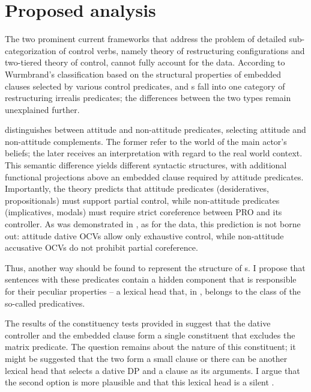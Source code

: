\documentclass[output=paper,colorlinks,citecolor=brown,newtxmath]{langsci/langscibook}
\begin{document}
\section{Proposed analysis}\label{s3}

The two prominent current frameworks that address the problem of detailed sub-categorization of control verbs, namely  theory of restructuring configurations and  two-tiered theory of control, cannot fully account for the  data. According to Wurmbrand’s classification based on the structural properties of embedded clauses selected by various control predicates,   and s fall into one category of restructuring irrealis predicates; the differences between the two types remain unexplained further. \par

\cite{Landau2015} distinguishes between attitude and non-attitude predicates, selecting attitude and non-attitude complements. The former refer to the world of the main actor’s beliefs; the later receives an interpretation with regard to the real world context. This semantic difference yields different syntactic structures, with additional functional projections above an embedded clause required by attitude predicates. Importantly, the theory predicts that attitude predicates (desideratives, propositionals) must support partial control, while non-attitude predicates (implicatives, modals) must require strict coreference between PRO and its controller. As was demonstrated in , as for the  data, this prediction is not borne out: attitude  dative OCVs allow only exhaustive control, while non-attitude  accusative OCVs do not prohibit partial coreference. \par

Thus, another way should be found to represent the structure of s. I propose that sentences with these predicates contain a hidden component that is responsible for their peculiar properties – a lexical  head that, in , belongs to the class of the so-called  predicatives. \par

The results of the constituency tests provided in  suggest that the dative controller and the embedded clause form a single constituent that excludes the matrix predicate. The question remains about the nature of this constituent; it might be suggested that the two form a small clause or there can be another lexical head that selects a dative DP and a clause as its arguments. I argue that the second option is more plausible and that this lexical head is a silent . \par
\end{document}
